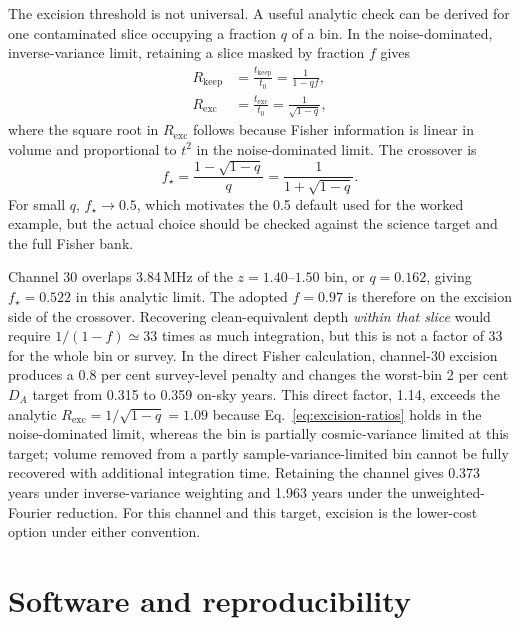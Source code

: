 The excision threshold is not universal. A useful analytic check can be
derived for one contaminated slice occupying a fraction $q$ of a bin.
In the noise-dominated, inverse-variance limit, retaining a slice
masked by fraction $f$ gives
\begin{equation}
\label{eq:excision-ratios}
\begin{aligned}
R_\mathrm{keep} &= \frac{t_\mathrm{keep}}{t_0} = \frac{1}{1-qf},\\[2pt]
R_\mathrm{exc} &= \frac{t_\mathrm{exc}}{t_0} = \frac{1}{\sqrt{1-q}},
\end{aligned}
\end{equation}
where the square root in $R_\mathrm{exc}$ follows because Fisher
information is linear in volume and proportional to $t^2$ in the
noise-dominated limit. The crossover is
\begin{equation}
\label{eq:crossover}
f_\star = \frac{1-\sqrt{1-q}}{q} = \frac{1}{1+\sqrt{1-q}}.
\end{equation}
For small $q$, $f_\star\to0.5$, which motivates the 0.5 default used
for the worked example, but the actual choice should be checked against
the science target and the full Fisher bank.

Channel 30 overlaps 3.84\,MHz of the $z=1.40$--$1.50$ bin, or
$q=0.162$, giving $f_\star=0.522$ in this analytic limit. The adopted
$f=0.97$ is therefore on the excision side of the crossover.
Recovering clean-equivalent depth \emph{within that slice} would
require $1/(1-f)\simeq33$ times as much integration, but this is not a
factor of 33 for the whole bin or survey. In the direct Fisher
calculation, channel-30 excision produces a 0.8 per cent survey-level
penalty and changes the worst-bin 2 per cent $D_A$ target from 0.315 to
0.359 on-sky years. This direct factor, 1.14, exceeds the analytic
$R_\mathrm{exc}=1/\sqrt{1-q}=1.09$ because
Eq.~\eqref{eq:excision-ratios} holds in the noise-dominated limit,
whereas the bin is partially cosmic-variance limited at this target;
volume removed from a partly sample-variance-limited bin cannot be
fully recovered with additional integration time. Retaining the
channel gives 0.373 years under inverse-variance weighting and 1.963
years under the unweighted-Fourier reduction. For this channel and this
target, excision is the lower-cost option under either convention.

\section{Software and reproducibility}
\label{sec:usage}

